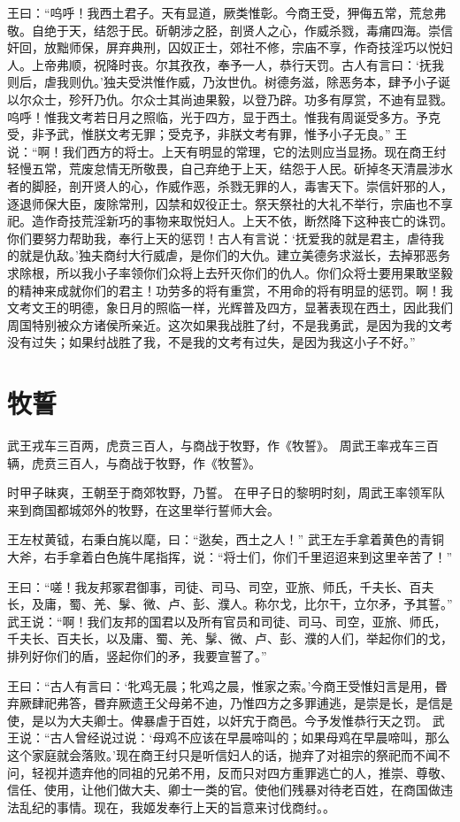 \documentclass[a4paper,12pt,UTF8,twoside]{ctexbook}
\begin{document}
王曰：“呜呼！我西土君子。天有显道，厥类惟彰。今商王受，狎侮五常，荒怠弗敬。自绝于天，结怨于民。斫朝涉之胫，剖贤人之心，作威杀戮，毒痡四海。崇信奸回，放黜师保，屏弃典刑，囚奴正士，郊社不修，宗庙不享，作奇技淫巧以悦妇人。上帝弗顺，祝降时丧。尔其孜孜，奉予一人，恭行天罚。古人有言曰：‘抚我则后，虐我则仇。’独夫受洪惟作威，乃汝世仇。树德务滋，除恶务本，肆予小子诞以尔众士，殄歼乃仇。尔众士其尚迪果毅，以登乃辟。功多有厚赏，不迪有显戮。呜呼！惟我文考若日月之照临，光于四方，显于西土。惟我有周诞受多方。予克受，非予武，惟朕文考无罪；受克予，非朕文考有罪，惟予小子无良。”
王说：“啊！我们西方的将士。上天有明显的常理，它的法则应当显扬。现在商王纣轻慢五常，荒废怠情无所敬畏，自己弃绝于上天，结怨于人民。斫掉冬天清晨涉水者的脚胫，剖开贤人的心，作威作恶，杀戮无罪的人，毒害天下。崇信奸邪的人，逐退师保大臣，废除常刑，囚禁和奴役正士。祭天祭社的大礼不举行，宗庙也不享祀。造作奇技荒淫新巧的事物来取悦妇人。上天不依，断然降下这种丧亡的诛罚。你们要努力帮助我，奉行上天的惩罚！古人有言说：‘抚爱我的就是君主，虐待我的就是仇敌。’独夫商纣大行威虐，是你们的大仇。建立美德务求滋长，去掉邪恶务求除根，所以我小子率领你们众将上去歼灭你们的仇人。你们众将士要用果敢坚毅的精神来成就你们的君主！功劳多的将有重赏，不用命的将有明显的惩罚。啊！我文考文王的明德，象日月的照临一样，光辉普及四方，显著表现在西土，因此我们周国特别被众方诸侯所亲近。这次如果我战胜了纣，不是我勇武，是因为我的文考没有过失；如果纣战胜了我，不是我的文考有过失，是因为我这小子不好。”

\chapter{牧誓}

武王戎车三百两，虎贲三百人，与商战于牧野，作《牧誓》。
周武王率戎车三百辆，虎贲三百人，与商战于牧野，作《牧誓》。

时甲子昧爽，王朝至于商郊牧野，乃誓。
在甲子日的黎明时刻，周武王率领军队来到商国都城郊外的牧野，在这里举行誓师大会。

王左杖黄钺，右秉白旄以麾，曰：“逖矣，西土之人！”
武王左手拿着黄色的青铜大斧，右手拿着白色旄牛尾指挥，说：“将士们，你们千里迢迢来到这里辛苦了！”

王曰：“嗟！我友邦冢君御事，司徒、司马、司空，亚旅、师氏，千夫长、百夫长，及庸，蜀、羌、髳、微、卢、彭、濮人。称尔戈，比尔干，立尔矛，予其誓。”
武王说：“啊！我们友邦的国君以及所有官员和司徒、司马、司空，亚旅、师氏，千夫长、百夫长，以及庸、蜀、羌、髳、微、卢、彭、濮的人们，举起你们的戈，排列好你们的盾，竖起你们的矛，我要宣誓了。”

王曰：“古人有言曰：‘牝鸡无晨；牝鸡之晨，惟家之索。’今商王受惟妇言是用，昬弃厥肆祀弗答，昬弃厥遗王父母弟不迪，乃惟四方之多罪逋逃，是崇是长，是信是使，是以为大夫卿士。俾暴虐于百姓，以奸宄于商邑。今予发惟恭行天之罚。
武王说：“古人曾经说过说：‘母鸡不应该在早晨啼叫的；如果母鸡在早晨啼叫，那么这个家庭就会落败。’现在商王纣只是听信妇人的话，抛弃了对祖宗的祭祀而不闻不问，轻视并遗弃他的同祖的兄弟不用，反而只对四方重罪逃亡的人，推崇、尊敬、信任、使用，让他们做大夫、卿士一类的官。使他们残暴对待老百姓，在商国做违法乱纪的事情。现在，我姬发奉行上天的旨意来讨伐商纣。。
\end{document}

